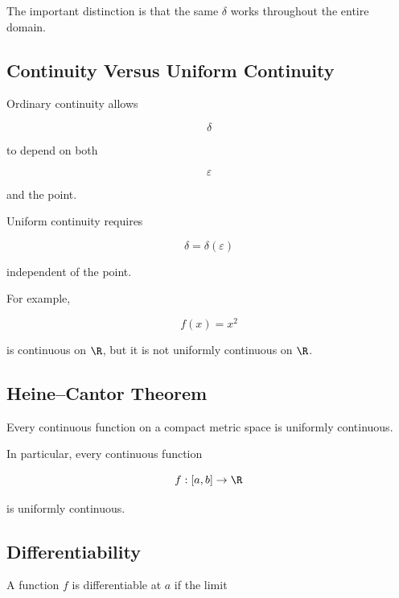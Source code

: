 The important distinction is that the same \(\delta\) works throughout the
entire domain.

\subsection{Continuity Versus Uniform Continuity}
\label{subsec:continuity-vs-uniform}

Ordinary continuity allows

\[
\delta
\]

to depend on both

\[
\varepsilon
\]

and the point.

Uniform continuity requires

\[
\boxed{
\delta=\delta(\varepsilon)
}
\]

independent of the point.

For example,

\[
f(x)=x^2
\]

is continuous on \(\R\), but it is not uniformly continuous on \(\R\).

\subsection{Heine--Cantor Theorem}
\label{subsec:heine-cantor}

\begin{theorem}
Every continuous function on a compact metric space is uniformly
continuous.
\end{theorem}

In particular, every continuous function

\[
f:[a,b]\to\R
\]

is uniformly continuous.

\subsection{Differentiability}
\label{subsec:differentiability-real-analysis}

A function \(f\) is differentiable at \(a\) if the limit

